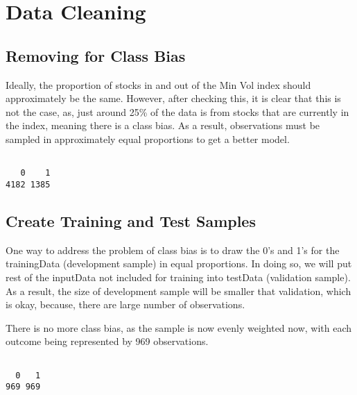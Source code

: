 \documentclass[12pt,twoside]{reedthesis}
\newenvironment{Shaded}{\begin{snugshade}}{\end{snugshade}}
\newcommand{\KeywordTok}[1]{\textcolor[rgb]{0.13,0.29,0.53}{\textbf{{#1}}}}
\newcommand{\NormalTok}[1]{{#1}}
\theoremstyle{definition}
\theoremstyle{definition}
\theoremstyle{definition}
\theoremstyle{remark}
\begin{document}
\section{Data Cleaning}\label{data-cleaning-1}

\subsection{Removing for Class Bias}\label{removing-for-class-bias}

Ideally, the proportion of stocks in and out of the Min Vol index should
approximately be the same. However, after checking this, it is clear
that this is not the case, as, just around 25\% of the data is from
stocks that are currently in the index, meaning there is a class bias.
As a result, observations must be sampled in approximately equal
proportions to get a better model.
\begin{Shaded}
\end{Shaded}
\begin{verbatim}

   0    1 
4182 1385 
\end{verbatim}
\subsection{Create Training and Test
Samples}\label{create-training-and-test-samples}

One way to address the problem of class bias is to draw the 0's and 1's
for the trainingData (development sample) in equal proportions. In doing
so, we will put rest of the inputData not included for training into
testData (validation sample). As a result, the size of development
sample will be smaller that validation, which is okay, because, there
are large number of observations.

There is no more class bias, as the sample is now evenly weighted now,
with each outcome being represented by 969 observations.
\begin{Shaded}
\end{Shaded}
\begin{verbatim}

  0   1 
969 969 
\end{verbatim}
\end{document}
